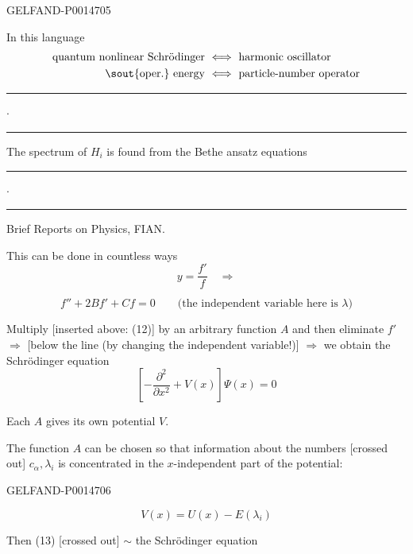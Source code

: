 \begin{GelfandAdjacentEvidence}{GELFAND-P001470}{5}


In this language
\[
\begin{aligned}
\text{quantum nonlinear Schrödinger}&\ \Longleftrightarrow\ \text{harmonic oscillator}\\
\text{\sout{oper.} energy}&\ \Longleftrightarrow\ \text{particle-number operator}
\end{aligned}
\]

\begin{center}
\rule{1.2cm}{.4pt}\quad\(\cdot\)\quad\rule{1.8cm}{.4pt}
\end{center}

The spectrum of \(H_i\) is found from the Bethe ansatz equations

\begin{center}
\rule{1.2cm}{.4pt}\quad\(\cdot\)\quad\rule{1.8cm}{.4pt}
\end{center}


Brief Reports on Physics, FIAN.


This can be done in countless ways
\[
y=\frac{f'}{f}\quad\Longrightarrow
\]

\begin{equation*}
f''+2Bf'+Cf=0
\qquad\text{(the independent variable here is \(\lambda\))}
\tag{12}
\end{equation*}

Multiply [inserted above: (12)] by an arbitrary function \(A\) and then eliminate \(f'\)
\(\Longrightarrow\) [below the line (by changing the independent variable!)]
\(\Longrightarrow\) we obtain the Schrödinger equation
\begin{equation*}
\left[-\frac{\partial^2}{\partial x^2}+V(x)\right]\Psi(x)=0
\tag{13}
\end{equation*}

Each \(A\) gives its own potential \(V\).

The function \(A\) can be chosen so that information about the numbers [crossed out]
\(c_\alpha,\lambda_i\) is concentrated in the \(x\)-independent part of the potential:
\end{GelfandAdjacentEvidence}
\begin{GelfandAdjacentEvidence}{GELFAND-P001470}{6}

\begin{equation*}
V(x)=U(x)-E(\lambda_i)
\tag{14}
\end{equation*}

Then (13) [crossed out] \(\sim\) the Schrödinger equation
\end{GelfandAdjacentEvidence}


